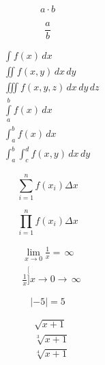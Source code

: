 \begin{center}
\begin{equation*}
	a\cdot b
\end{equation*}

\begin{equation*}
	\frac{a}{b}
\end{equation*}

\begin{align*}
	&\int f(x)\,dx\\
        &\iint f(x,y)\,dx\,dy\\
        &\iiint f(x,y,z)\,dx\,dy\,dz\\
        &\int\limits_{a}^{b}f(x)\,dx\\
        &\int_{a}^{b}f(x)\,dx\\
        &\int_{a}^{b}\int_{c}^{d}f(x,y)\,dx\,dy
\end{align*}

\begin{equation*}
	\sum_{i=1}^n f(x_i) \Delta x
\end{equation*}

\begin{equation*}
	\prod_{i=1}^n f(x_i) \Delta x
\end{equation*}

\begin{align*}
	&\lim_{x \to 0} \frac{1}{x} = \,\infty \\ 
        &\frac{1}{x}\stackrel[] {x \to 0}{\longrightarrow}\,\infty
\end{align*}

\begin{equation*}
	\lvert -5 \rvert=5
\end{equation*}

\begin{align*}
	&\sqrt{x+1}\\
        &\sqrt[3]{x+1}\\
        &\sqrt[4]{x+1}
\end{align*}


\end{center}
